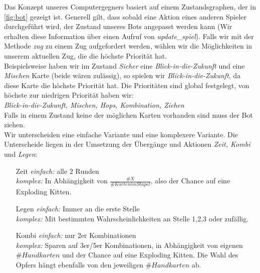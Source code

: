 \documentclass[11pt, a4paper, oneside]{memoir}                                                      %
\begin{document}
        Das Konzept unseres Computergegners basiert auf einem Zustandsgraphen, der in \ref{fig:bot} gezeigt ist.
        Generell gilt, dass sobald eine Aktion eines anderen Spieler durchgeführt wird, der Zustand unseres Bots angepasst werden kann
        (Wir erhalten diese Information über einen Aufruf von \textit{update\_spiel}). Falls wir mit der Methode \textit{zug} zu einem Zug aufgefordert werden,
        wählen wir die Möglichkeiten in unserem aktuellen Zug, die die höchste Priorität hat. \\
        Beispielsweise haben wir im Zustand \textit{Sicher} eine \textit{Blick-in-die-Zukunft} und eine \textit{Mischen} Karte (beide wären zulässig), so
        spielen wir \textit{Blick-in-die-Zukunft}, da diese Karte die höchste Priorität hat. Die Prioritäten sind global festgelegt, von höchste zur niedrigen Priorität haben wir:\\

        \textit{Blick-in-die-Zukunft, Mischen, Hops, Kombination, Ziehen}\\
    
        Falls in einem Zustand keine der möglichen Karten vorhanden sind muss der Bot ziehen.\\
        Wir unterscheiden eine einfache Variante und eine komplexere Variante. Die Unterscheide liegen in der Umsetzung der Übergänge und Aktionen
        \textit{Zeit, Kombi} und \textit{Legen}:\\

        \begin{enumerate}
            \item [Zeit] \textit{einfach:} alle 2 Runden\\
                \textit{komplex:} In Abhängigkeit von $\frac{\#X}{\#Karten im Stapel}$, also der Chance auf eine Exploding Kitten.
            \item [Legen] \textit{einfach:} Immer an die erste Stelle\\
                \textit{komplex:} Mit bestimmten Wahrscheinlichkeiten an Stelle 1,2,3 oder zufällig.
            \item [Kombi] \textit{einfach:} nur 2er Kombinationen\\
                \textit{komplex:} Sparen auf 3er/5er Kombinationen, in Abhängigkeit von eigenen $\#Handkarten$ und der Chance auf eine Exploding Kitten. Die Wahl des Opfers hängt ebenfalls von den jeweiligen $\#Handkarten$ ab.
        
        \end{enumerate}
\end{document}
